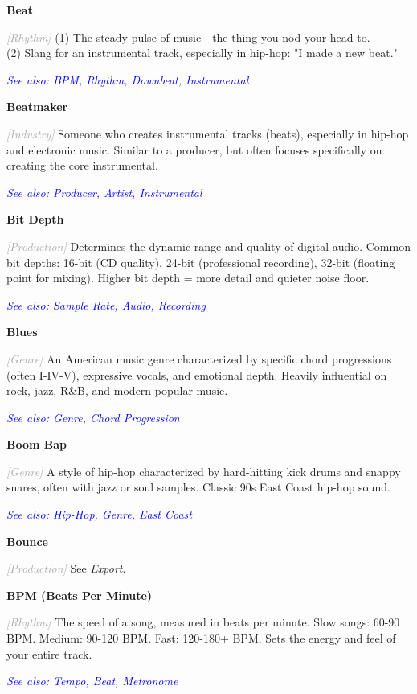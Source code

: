 \documentclass[11pt,letterpaper]{article}
\newcommand{\term}[1]{\textbf{\large\color{purple}#1}}
\newcommand{\category}[1]{\textcolor{darkgray}{\textit{\small [#1]}}}
\newcommand{\seealso}[1]{\textcolor{blue}{\textit{See also: #1}}}
\newenvironment{termdef}[1]
  {\noindent\term{#1}\par\nopagebreak}
  {\par\vspace{0.3em}}
\begin{document}
\begin{termdef}{Beat}
\category{Rhythm}
(1) The steady pulse of music—the thing you nod your head to. \\
(2) Slang for an instrumental track, especially in hip-hop: "I made a new beat."

\seealso{BPM, Rhythm, Downbeat, Instrumental}
\end{termdef}

\begin{termdef}{Beatmaker}
\category{Industry}
Someone who creates instrumental tracks (beats), especially in hip-hop and electronic music. Similar to a producer, but often focuses specifically on creating the core instrumental.

\seealso{Producer, Artist, Instrumental}
\end{termdef}

\begin{termdef}{Bit Depth}
\category{Production}
Determines the dynamic range and quality of digital audio. Common bit depths: 16-bit (CD quality), 24-bit (professional recording), 32-bit (floating point for mixing). Higher bit depth = more detail and quieter noise floor.

\seealso{Sample Rate, Audio, Recording}
\end{termdef}

\begin{termdef}{Blues}
\category{Genre}
An American music genre characterized by specific chord progressions (often I-IV-V), expressive vocals, and emotional depth. Heavily influential on rock, jazz, R\&B, and modern popular music.

\seealso{Genre, Chord Progression}
\end{termdef}

\begin{termdef}{Boom Bap}
\category{Genre}
A style of hip-hop characterized by hard-hitting kick drums and snappy snares, often with jazz or soul samples. Classic 90s East Coast hip-hop sound.

\seealso{Hip-Hop, Genre, East Coast}
\end{termdef}

\begin{termdef}{Bounce}
\category{Production}
See \textit{Export}.
\end{termdef}

\begin{termdef}{BPM (Beats Per Minute)}
\category{Rhythm}
The speed of a song, measured in beats per minute. Slow songs: 60-90 BPM. Medium: 90-120 BPM. Fast: 120-180+ BPM. Sets the energy and feel of your entire track.

\seealso{Tempo, Beat, Metronome}
\end{termdef}
\end{document}
